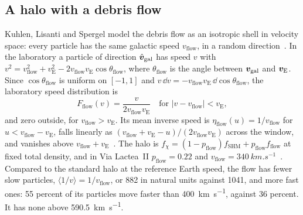 \subsection{A halo with a debris flow}\label{sec:21.1-debris}

Kuhlen, Lisanti and Spergel model the debris flow as an isotropic shell in velocity space: every particle has the same galactic speed $v_{\mathrm{flow}}$, in a random direction~\cite{kuhlen2012direct}. In the laboratory a particle of direction $\hat{\bm{v}}_{\mathrm{gal}}$ has speed $v$ with $v^2 = v_{\mathrm{flow}}^2 + v_{\mathrm{E}}^2 - 2v_{\mathrm{flow}}v_{\mathrm{E}}\cos\theta_{\mathrm{flow}}$, where $\theta_{\mathrm{flow}}$ is the angle between $\bm{v}_{\mathrm{gal}}$ and $\bm{v}_{\mathrm{E}}$. Since $\cos\theta_{\mathrm{flow}}$ is uniform on $[-1,1]$ and $v\,\dd v = -v_{\mathrm{flow}}v_{\mathrm{E}}\,\dd\cos\theta_{\mathrm{flow}}$, the laboratory speed distribution is~\cite[Eq.~(7)]{kuhlen2012direct}
\begin{equation}
  F_{\mathrm{flow}}(v) = \frac{v}{2v_{\mathrm{flow}}v_{\mathrm{E}}}\quad\text{for } |v - v_{\mathrm{flow}}| < v_{\mathrm{E}} ,
  \label{eq:21.1-fflow}
\end{equation}
and zero outside, for $v_{\mathrm{flow}} > v_{\mathrm{E}}$. Its mean inverse speed is $\eta_{\mathrm{flow}}(u) = 1/v_{\mathrm{flow}}$ for $u < v_{\mathrm{flow}} - v_{\mathrm{E}}$, falls linearly as $(v_{\mathrm{flow}} + v_{\mathrm{E}} - u)/(2v_{\mathrm{flow}}v_{\mathrm{E}})$ across the window, and vanishes above $v_{\mathrm{flow}} + v_{\mathrm{E}}$~\cite[Eq.~(8)]{kuhlen2012direct}. The halo is $f_\chi = (1 - p_{\mathrm{flow}})f_{\mathrm{SHM}} + p_{\mathrm{flow}}f_{\mathrm{flow}}$ at fixed total density, and in Via Lactea~II $p_{\mathrm{flow}} = 0.22$ and $v_{\mathrm{flow}} = \SI{340}{km.s^{-1}}$~\cite[Eq.~(10) and Fig.~6]{kuhlen2012direct}. Compared to the standard halo at the reference Earth speed, the flow has fewer slow particles, $\langle1/v\rangle = 1/v_{\mathrm{flow}}$, or 882 in natural units against 1041, and more fast ones: 55 percent of its particles move faster than \SI{400}{km.s^{-1}}, against 36 percent. It has none above \SI{590.5}{km.s^{-1}}.

